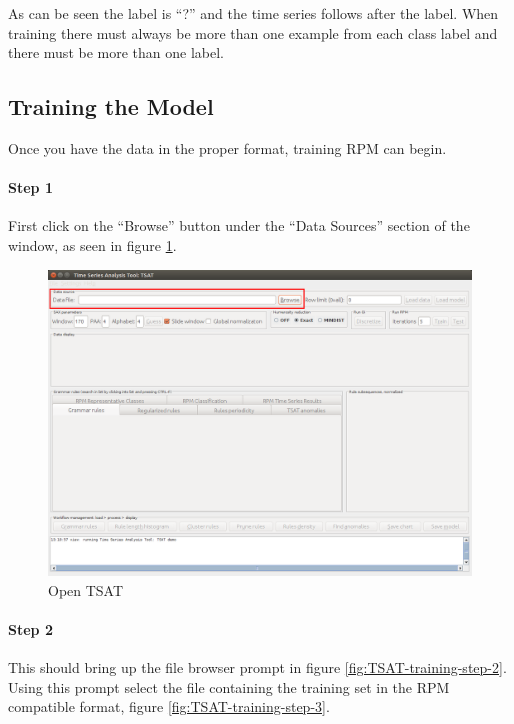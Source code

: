 \documentclass[letterpaper, 12pt]{article}
\begin{document}
As can be seen the label is ``?'' and the time series follows after the label.  When training there must always be more than one example from each class label and there must be more than one label.

\subsection{Training the Model}
\label{RPMTrain}

Once you have the data in the proper format, training RPM can begin.

\paragraph{Step 1}
First click on the ``Browse'' button under the ``Data Sources'' section of the window, as seen in figure \ref{fig:TSAT-training-step-1}. 

\begin{figure}[h]
	\includegraphics[width=\textwidth]{TSAT-training-step-1}
	\caption{Open TSAT}
	\label{fig:TSAT-training-step-1}
\end{figure}
\newpage
\paragraph{Step 2}
This should bring up the file browser prompt in figure \ref{fig:TSAT-training-step-2}. Using this prompt select the file containing the training set in the RPM compatible format, figure \ref{fig:TSAT-training-step-3}.
\end{document}

